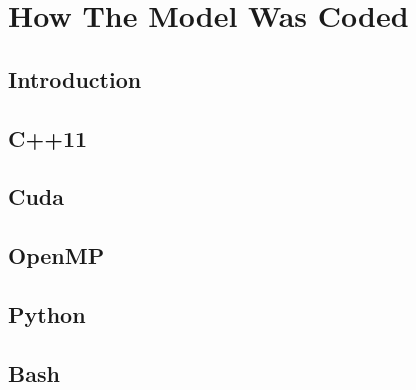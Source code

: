 \chapter{How The Model Was Coded}
\section{Introduction}
\section{C++11}
\section{Cuda}
\section{OpenMP}
\section{Python}
\section{Bash}
